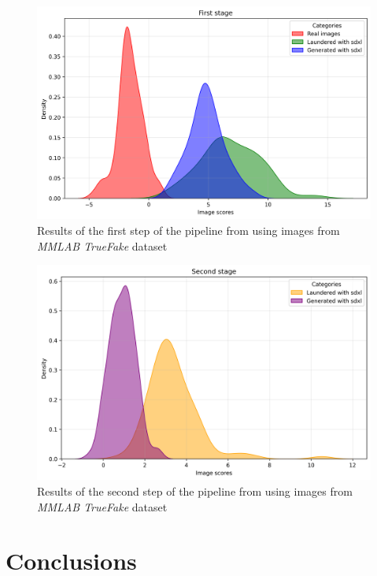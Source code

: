 \documentclass[conference]{IEEEtran} %
\begin{document}
    \begin{figure}[h]
        \centering
        \includegraphics[width=0.95\linewidth]{Img/first_stage.png}
        \caption{Results of the first step of the pipeline from \cite{mandelli2024synthetic} using images from \textit{MMLAB TrueFake} dataset}
        \label{fig:first_stage}
    \end{figure}

    \begin{figure}[h]
        \centering
        \includegraphics[width=0.95\linewidth]{Img/second_stage.png}
        \caption{Results of the second step of the pipeline from \cite{mandelli2024synthetic} using images from \textit{MMLAB TrueFake} dataset}
        \label{fig:second_stage}
    \end{figure}
\section{Conclusions}


\end{document}
